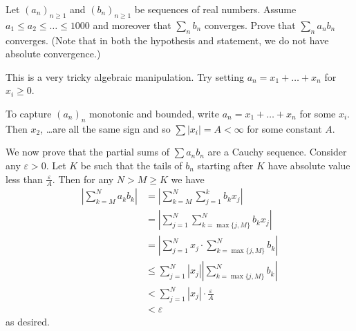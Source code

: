 \begin{problem}
	\gim
	Let $(a_n)_{n \ge 1}$ and $(b_n)_{n \ge 1}$ be sequences of real numbers.
	Assume $a_1 \le a_2 \le \dots \le 1000$
	and moreover that $\sum_n b_n$ converges.
	Prove that $\sum_n a_n b_n$ converges.
	(Note that in both the hypothesis and statement,
	we do not have absolute convergence.)
	\begin{hint}
		This is a very tricky algebraic manipulation.
		Try setting $a_n = x_1 + \dots + x_n$ for $x_i \ge 0$.
	\end{hint}
	\begin{sol}
		To capture $(a_n)_n$ monotonic and bounded,
		write $a_n = x_1 + \dots + x_n$ for some $x_i$.
		Then $x_2$, \dots are all the same sign and so $\sum |x_i| = A < \infty$
		for some constant $A$.

		We now prove that the partial sums of $\sum a_n b_n$ are a Cauchy sequence.
		Consider any $\varepsilon > 0$.
		Let $K$ be such that the tails of $b_n$
		starting after $K$ have absolute value less than $\frac{\varepsilon}{A}$.
		Then for any $N > M \ge K$ we have
		\begin{align*}
			\left\lvert \sum_{k=M}^N a_k b_k \right\rvert
			&= \left\lvert \sum_{k=M}^N \sum_{j=1}^k b_k x_j \right\rvert \\
			&= \left\lvert \sum_{j=1}^N \sum_{k=\max\{j,M\}}^N b_k x_j \right\rvert \\
			&= \left\lvert \sum_{j=1}^N x_j \cdot \sum_{k=\max\{j,M\}}^N b_k\right\rvert \\
			&\le \sum_{j=1}^N |x_j| \left\lvert \sum_{k=\max\{j,M\}}^N b_k \right\rvert \\
			&< \sum_{j=1}^N |x_j| \cdot \frac{\varepsilon}{A} \\
			&< \varepsilon
		\end{align*}
		as desired.
	\end{sol}
\end{problem}

